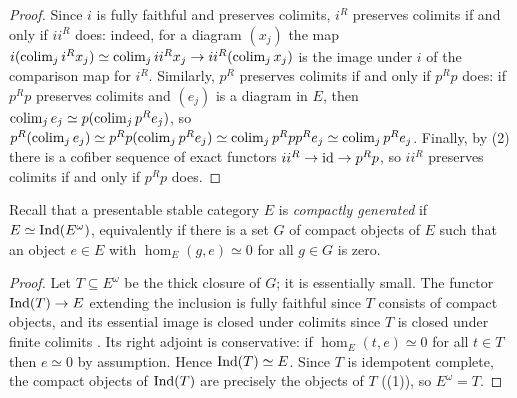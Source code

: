 	\begin{proof}
		Since $i$ is fully faithful and preserves colimits, $i^R$ preserves colimits if and only if $ii^R$ does: indeed, for a diagram $(x_j)$ the map $i(\operatorname{colim}_j i^Rx_j) \simeq \operatorname{colim}_j ii^Rx_j \to ii^R(\operatorname{colim}_j x_j)$ is the image under $i$ of the comparison map for $i^R$. Similarly, $p^R$ preserves colimits if and only if $p^Rp$ does: if $p^Rp$ preserves colimits and $(e_j)$ is a diagram in $E$, then $\operatorname{colim}_j e_j \simeq p(\operatorname{colim}_j p^Re_j)$, so $p^R(\operatorname{colim}_j e_j) \simeq p^Rp(\operatorname{colim}_j p^Re_j) \simeq \operatorname{colim}_j p^Rpp^Re_j \simeq \operatorname{colim}_j p^Re_j$. Finally, by (2) there is a cofiber sequence of exact functors $ii^R \to \operatorname{id} \to p^Rp$, so $ii^R$ preserves colimits if and only if $p^Rp$ does.
	\end{proof}

	Recall that a presentable stable category $E$ is \emph{compactly generated} if $E \simeq \operatorname{Ind}(E^{\omega})$, equivalently if there is a set $G$ of compact objects of $E$ such that an object $e \in E$ with $\hom_E(g,e) \simeq 0$ for all $g \in G$ is zero.

	\begin{proof}
		Let $T \subseteq E^{\omega}$ be the thick closure of $G$; it is essentially small. The functor $\operatorname{Ind}(T) \to E$ extending the inclusion is fully faithful since $T$ consists of compact objects, and its essential image is closed under colimits since $T$ is closed under finite colimits \cite[Section~5.3.5]{lurie2009HTT}. Its right adjoint is conservative: if $\hom_E(t,e) \simeq 0$ for all $t \in T$ then $e \simeq 0$ by assumption. Hence $\operatorname{Ind}(T) \simeq E$. Since $T$ is idempotent complete, the compact objects of $\operatorname{Ind}(T)$ are precisely the objects of $T$ ((1)), so $E^{\omega} = T$.
	\end{proof}

